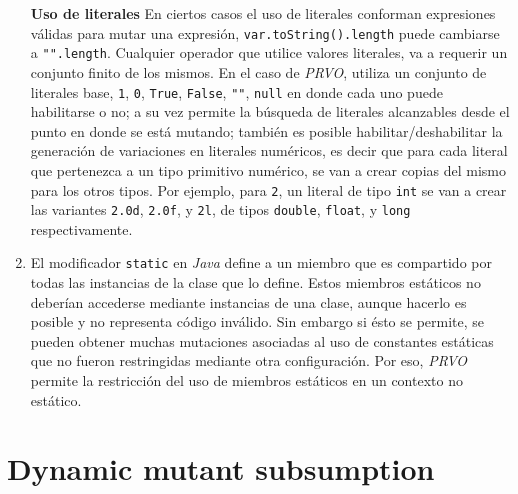 \begin{enumerate}[leftmargin=.75cm,align=left]
	\item[\textbf{Uso de literales}] En ciertos casos el uso de literales conforman expresiones v\'alidas para mutar una expresi\'on, \lstinline|var.toString().length| puede cambiarse a \lstinline|"".length|. Cualquier operador que utilice valores literales, va a requerir un conjunto finito de los mismos. En el caso de \emph{PRVO}, utiliza un conjunto de literales base, \lstinline|1|, \lstinline|0|, \lstinline|True|, \lstinline|False|, \lstinline|""|, \lstinline|null| en donde cada uno puede habilitarse o no; a su vez permite la b\'usqueda de literales alcanzables desde el punto en donde se est\'a mutando; tambi\'en es posible habilitar/deshabilitar la generaci\'on de variaciones en literales num\'ericos, es decir que para cada literal que pertenezca a un tipo primitivo num\'erico, se van a crear copias del mismo para los otros tipos. Por ejemplo, para \texttt{2}, un literal de tipo \texttt{int} se van a crear las variantes \texttt{2.0d}, \texttt{2.0f}, y \texttt{2l}, de tipos \lstinline{double}, \lstinline{float}, y \lstinline{long} respectivamente.
	
	\item[\textbf{Uso de campos est\'aticos}] El modificador \lstinline{static} en \emph{Java} define a un miembro que es compartido por todas las instancias de la clase que lo define. Estos miembros est\'aticos no deber\'ian accederse mediante instancias de una clase, aunque hacerlo es posible y no representa c\'odigo inv\'alido. Sin embargo si \'esto se permite, se pueden obtener muchas mutaciones asociadas al uso de constantes est\'aticas que no fueron restringidas mediante otra configuraci\'on. Por eso, \emph{PRVO} permite la restricci\'on del uso de miembros est\'aticos en un contexto no est\'atico.
\end{enumerate}

\section{Dynamic mutant subsumption}
\label{sec:implementation.dynamicSubsumption}


